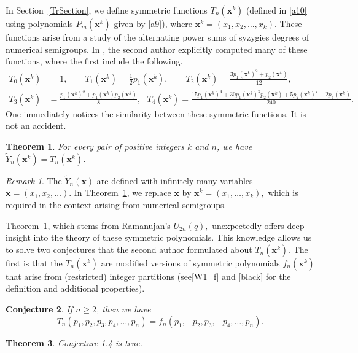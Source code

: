 \documentclass[11pt]{amsart}
\newtheorem{theorem}{Theorem}[section]
\newtheorem{conjecture}[theorem]{Conjecture}
\theoremstyle{definition}
\theoremstyle{remark}
\newtheorem*{remark}{Remark}
\numberwithin{equation}{section}
\begin{document}
In Section~\ref{TrSection}, we define symmetric functions $T_n(\pmb{x}^k)$ (defined in \eqref{a10}  using polynomials $P_m(\pmb{x}^k)$ given by \eqref{a9}), where $\pmb{x}^k=(x_1, x_2,\dots, x_k)$. These functions arise from a study of the alternating power sums of syzygies degrees of numerical semigroups.
In \cite{Fel}, the second author explicitly computed many of these functions, where the first include the following.
\begin{align*}
T_0(\pmb{x}^k)&=1, \qquad
T_1(\pmb{x}^k) = \frac12p_1(\pmb{x}^k), \qquad
T_2(\pmb{x}^k) = \frac{3p_1(\pmb{x}^k)^2+p_2(\pmb{x}^k)}{12}, \\
T_3(\pmb{x}^k) &= \frac{p_1(\pmb{x}^k)^3+p_1(\pmb{x}^k)p_2(\pmb{x}^k)}8, \ \ \
T_4(\pmb{x}^k) = \frac{15p_1(\pmb{x}^k)^4+30p_1(\pmb{x}^k)^2p_2(\pmb{x}^k)+5p_2(\pmb{x}^k)^2-2p_4(\pmb{x}^k)}{240}.
\end{align*}
One immediately notices the similarity between these symmetric functions. It is not an accident. 

\begin{theorem}\label{T_and_Y} For every pair of positive integers $k$ and $n$,   we have  $\widetilde{{Y}}_n(\pmb{x}^k) = T_n(\pmb{x}^k)$.
\end{theorem}

\begin{remark} The $\widetilde{Y}_n(\pmb{x})$ are defined with infinitely many variables $\pmb{x}=(x_1, x_2,\dots).$ In Theorem~\ref{T_and_Y}, we replace $\pmb{x}$ by $\pmb{x}^k=(x_1,\dots, x_k),$ which is required in the context arising from numerical semigroups.
\end{remark}

Theorem~\ref{T_and_Y}, which stems from Ramanujan's $U_{2n}(q),$ unexpectedly offers deep insight into the theory of these symmetric polynomials. This knowledge allows us to solve two conjectures that the second author \cite{Fel}
formulated about $T_n(\pmb{x}^k)$. The first is that the $T_n(\pmb{x}^k)$ are modified versions of symmetric polynomials $f_n(\pmb{x}^k)$ that arise from (restricted) integer partitions (see\eqref{W1_f} and \eqref{black} for the definition and additional properties).

\begin{conjecture}{{}} If $n\geq 2$, then we have
$$
T_n(p_1,p_2,p_3,p_4,\dots,p_n)=f_n(p_1,-p_2,p_3,-p_4,\dots,p_n).
$$
\end{conjecture}
\begin{theorem}\label{Conjecture1} Conjecture 1.4 is true.
\end{theorem}
\end{document}
